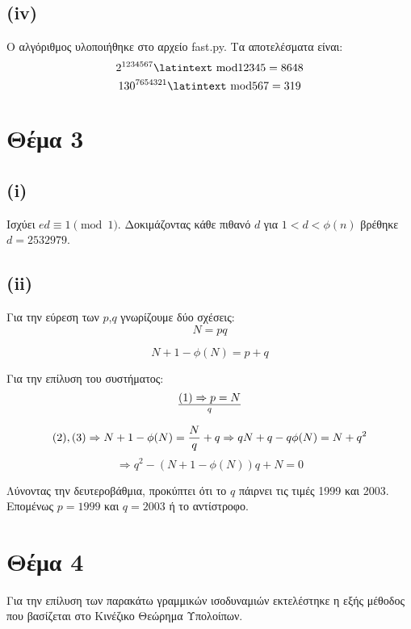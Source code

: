 \documentclass[a4paper, 11pt]{article}
\newcommand{\lt}{\latintext}
\begin{document}
\subsection*{({\lt iv})}
Ο αλγόριθμος υλοποιήθηκε στο αρχείο {\lt fast.py}. Τα αποτελέσματα είναι:
\[2^{1234567} \textrm{\lt mod} 12345 = 8648\]
\[130^{7654321} \textrm{\lt mod} 567 = 319\]
\newpage


\section*{Θέμα 3}
\subsection*{({\lt i})}
Ισχύει $ed \equiv 1 \pmod{1} $. Δοκιμάζοντας κάθε πιθανό $d$ για $1 < d < \phi(n)$ βρέθηκε $d = 2532979$.

\subsection*{({\lt ii})}
Για την εύρεση των $p$,$q$ γνωρίζουμε δύο σχέσεις:
\begin{equation}
N = pq
\end{equation}

\begin{equation}
N + 1 - \phi(N) = p + q
\end{equation}

\noindent Για την επίλυση του συστήματος:
\begin{equation}
(1) \Rightarrow p = N \over q
\end{equation}

\begin{equation*}
(2),(3) \Rightarrow N + 1 - \phi(N) = {N\over q} + q \Rightarrow qN + q - q\phi(N) = N + q^2
\end{equation*}
\[ \Rightarrow q^2 - (N + 1 - \phi(N))q + N = 0 \]

\noindent Λύνοντας την δευτεροβάθμια, προκύπτει ότι το $q$ πάιρνει τις τιμές 1999 και 2003. \\

Επομένως $p = 1999$ και $q=2003$ ή το αντίστροφο.

\newpage


\section*{Θέμα 4}


Για την επίλυση των παρακάτω γραμμικών ισοδυναμιών εκτελέστηκε η εξής μέθοδος που βασίζεται στο Κινέζικο Θεώρημα Υπολοίπων.
\end{document}
